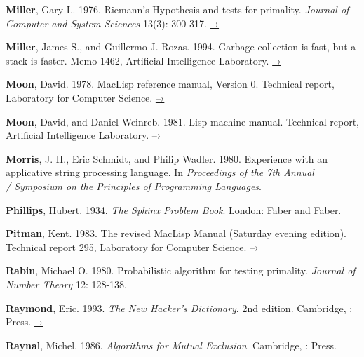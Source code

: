 { \label{Miller 1976}
\textbf{Miller}, Gary L.  1976.  Riemann's Hypothesis and tests for primality.
\textit{Journal of Computer and System Sciences} 13(3): 300-317.
\href{http://www.cs.cmu.edu/~glmiller/Publications/b2hd-Mi76.html}{–›}

 \label{Miller and Rozas 1994}
\textbf{Miller}, James S., and Guillermo J. Rozas. 1994.  Garbage
collection is fast,
but a stack is faster.  Memo 1462,  Artificial Intelligence
Laboratory.
\href{http://dspace.mit.edu/handle/1721.1/6622}{–›}

 \label{Moon 1978}
\textbf{Moon}, David.  1978.  MacLisp reference manual, Version 0.
Technical report,
 Laboratory for Computer Science.
\href{http://www.softwarepreservation.org/projects/LISP/MIT/Moon-MACLISP_Reference_Manual-Apr_08_1974.pdf/view}{–›}

 \label{Moon and Weinreb 1981}
\textbf{Moon}, David, and Daniel Weinreb.  1981.  Lisp machine
manual.  Technical
report,  Artificial Intelligence Laboratory.
\href{http://www.unlambda.com/lmman/index.html}{–›}

 \label{Morris et al. 1980}
\textbf{Morris}, J. H., Eric Schmidt, and Philip Wadler.  1980.
Experience with an applicative string processing language.  In
\textit{Proceedings of the 7th Annual\\ 
/ Symposium on the Principles of Programming
Languages}.

 \label{Phillips 1934}
\textbf{Phillips}, Hubert.  1934. \textit{The Sphinx Problem Book}.
London: Faber and
Faber.

 \label{Pitman 1983}
\textbf{Pitman}, Kent. 1983. The revised MacLisp Manual (Saturday
evening edition).
Technical report 295,  Laboratory for Computer Science.
\href{http://maclisp.info/pitmanual}{–›}

 \label{Rabin 1980}
\textbf{Rabin}, Michael O. 1980. Probabilistic algorithm for
testing primality.
\textit{Journal of Number Theory} 12: 128-138.

 \label{Raymond 1993}
\textbf{Raymond}, Eric.  1993. \textit{The New Hacker's
Dictionary}. 2nd edition.
Cambridge, :  Press.
\href{http://www.catb.org/jargon/}{–›}

\textbf{Raynal}, Michel. 1986. \textit{Algorithms for Mutual
Exclusion}.  Cambridge, :
 Press.

}
